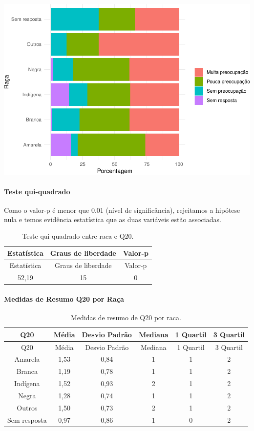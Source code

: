 \documentclass[]{article}
\let\oldparagraph\paragraph
\renewcommand{\paragraph}[1]{\oldparagraph{#1}\mbox{}}
\begin{document}
\begin{center}\includegraphics[width=0.75\linewidth]{relatorio_covid19_files/figure-latex/unnamed-chunk-397-1} \end{center}

\hypertarget{teste-qui-quadrado-35}{%
\paragraph{Teste qui-quadrado}\label{teste-qui-quadrado-35}}

Como o valor-p é menor que 0.01 (nível de significância), rejeitamos a hipótese nula e temos evidência estatística que as duas variáveis estão associadas.

\begin{longtable}[]{@{}ccc@{}}
\caption{\label{tab:unnamed-chunk-399}Teste qui-quadrado entre raca e Q20.}\tabularnewline
\toprule
Estatística & Graus de liberdade & Valor-p\tabularnewline
\midrule
\endfirsthead
\toprule
Estatística & Graus de liberdade & Valor-p\tabularnewline
\midrule
\endhead
52,19 & 15 & 0\tabularnewline
\bottomrule
\end{longtable}

\cleardoublepage

\hypertarget{medidas-de-resumo-q20-por-rauxe7a}{%
\paragraph{Medidas de Resumo Q20 por Raça}\label{medidas-de-resumo-q20-por-rauxe7a}}

\begin{longtable}[]{@{}cccccc@{}}
\caption{\label{tab:unnamed-chunk-400}Medidas de resumo de Q20 por raca.}\tabularnewline
\toprule
Q20 & Média & Desvio Padrão & Mediana & 1 Quartil & 3 Quartil\tabularnewline
\midrule
\endfirsthead
\toprule
Q20 & Média & Desvio Padrão & Mediana & 1 Quartil & 3 Quartil\tabularnewline
\midrule
\endhead
Amarela & 1,53 & 0,84 & 1 & 1 & 2\tabularnewline
Branca & 1,19 & 0,78 & 1 & 1 & 2\tabularnewline
Indígena & 1,52 & 0,93 & 2 & 1 & 2\tabularnewline
Negra & 1,28 & 0,74 & 1 & 1 & 2\tabularnewline
Outros & 1,50 & 0,73 & 2 & 1 & 2\tabularnewline
Sem resposta & 0,97 & 0,86 & 1 & 0 & 2\tabularnewline
\bottomrule
\end{longtable}
\end{document}
